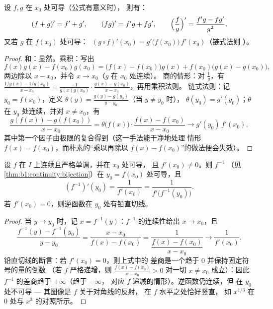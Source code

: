 \begin{theorem}[运算法则]\label{thm:b1:derivative:operations}
设 $f, g$ 在 $x_0$ 处可导（公式有意义时），
则有：
\[
(f + g)' = f' + g', \qquad
(fg)' = f'g + fg', \qquad
\Bigl(\frac fg\Bigr)' = \frac{f'g - fg'}{g^2},
\]
又若 $g$ 在 $f(x_0)$ 处可导：
$\;(g \circ f)'(x_0) = g'\bigl(f(x_0)\bigr)\, f'(x_0)$（链式法则
）。
\end{theorem}

\begin{proof}
和：显然。乘积：写出
\[
f(x)g(x) - f(x_0)g(x_0)
= \bigl(f(x) - f(x_0)\bigr) g(x) + f(x_0)\bigl(g(x) - g(x_0)\bigr),
\]
两边除以 $x - x_0$，并令 $x \to x_0$（$g$ 在 $x_0$ 处连续）。
商的情形：对 $\frac 1g$，有 $\frac{1/g(x) - 1/g(x_0)}{x - x_0} =
\frac{-1}{g(x)g(x_0)}\cdot\frac{g(x) - g(x_0)}{x - x_0}$，再用乘积法则。
链式法则：记 $y_0 = f(x_0)$，定义
$\theta(y) = \frac{g(y) - g(y_0)}{y - y_0}$（当 $y \neq y_0$ 时），
$\theta(y_0) = g'(y_0)$；$\theta$ 在 $y_0$ 处连续，并对
$x \neq x_0$，有
\[
\frac{g(f(x)) - g(f(x_0))}{x - x_0}
= \theta\bigl(f(x)\bigr)\cdot \frac{f(x) - f(x_0)}{x - x_0}
\longrightarrow g'(y_0)\, f'(x_0),
\]
其中第一个因子由极限的复合得到（这一手法能干净地处理
情形 $f(x) = f(x_0)$，而朴素的“乘以再除以
$f(x) - f(x_0)$”的做法便会失效）。
\end{proof}

\begin{theorem}[反函数的导数]\label{thm:b1:derivative:inverse}
设 $f$ 在 $I$ 上连续且严格单调，并在 $x_0$ 处可导，
且 $f'(x_0) \neq 0$。则 $f^{-1}$
（见\cref{thm:b1:continuity:bijection}）在 $y_0 =
f(x_0)$ 处可导，且
\[
(f^{-1})'(y_0) = \frac{1}{f'(x_0)} = \frac{1}{f'\bigl(f^{-1}(y_0)\bigr)} .
\]
若 $f'(x_0) = 0$，则逆函数在 $y_0$ 处有铅直切线。
\end{theorem}

\begin{proof}
当 $y \to y_0$ 时，记 $x = f^{-1}(y)$：$f^{-1}$ 的连续性给出 $x
\to x_0$，且
\[
\frac{f^{-1}(y) - f^{-1}(y_0)}{y - y_0}
= \frac{x - x_0}{f(x) - f(x_0)}
= \frac{1}{\dfrac{f(x) - f(x_0)}{x - x_0}}
\longrightarrow \frac{1}{f'(x_0)} .
\]
铅直切线的断言：若 $f'(x_0) = 0$，则上式中的
差商是一个趋于 $0$ 并保持固定符号的量的倒数
（若 $f$ 严格递增，则 $\frac{f(x) -
f(x_0)}{x - x_0} > 0$ 对一切 $x \neq x_0$ 成立）：因此
$f^{-1}$ 的差商趋于 $+\infty$（趋于 $-\infty$，
对应 $f$ 递减的情形）。逆函数仍连续，但
在 $y_0$ 处不可导 --- 其图像是 $f$ 关于对角线的反射，
在 $f$ 水平之处恰好竖直，
如 $x^{1/3}$ 在 $0$ 处与 $x^3$ 的对照所示。
\end{proof}

